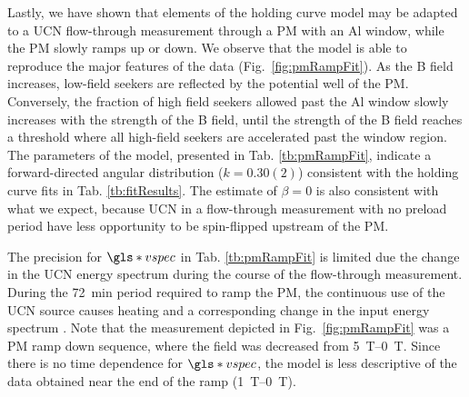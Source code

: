 Lastly, we have shown that elements of the holding curve model may be adapted to a UCN flow-through measurement through a PM with an Al window, while the PM slowly ramps up or down. We observe that the model is able to reproduce the major features of the data (Fig.~\ref{fig:pmRampFit}). As the B field increases, low-field seekers are reflected by the potential well of the PM. Conversely, the fraction of high field seekers allowed past the Al window slowly increases with the strength of the B field, until the strength of the B field reaches a threshold where all high-field seekers are accelerated past the window region. The parameters of the model, presented in Tab. \ref{tb:pmRampFit}, indicate a forward-directed angular distribution ($k=0.30(2)$) consistent with the holding curve fits in Tab. \ref{tb:fitResults}. The estimate of $\beta=0$ is also consistent with what we expect, because UCN in a flow-through measurement with no preload period have less opportunity to be spin-flipped upstream of the PM.

The precision for $\gls*{vspec}$ in Tab. \ref{tb:pmRampFit} is limited due the change in the UCN energy spectrum during the course of the flow-through measurement. During the \qty{72}{\minute} period required to ramp the PM, the continuous use of the UCN source causes heating and a corresponding change in the input energy spectrum \cite{anghel_solid_2018}. Note that the measurement depicted in Fig.~\ref{fig:pmRampFit} was a PM ramp down sequence, where the field was decreased from \qtyrange{5}{0}{\tesla}. Since there is no time dependence for $\gls*{vspec}$, the model is less descriptive of the data obtained near the end of the ramp (\qtyrange{1}{0}{\tesla}).

